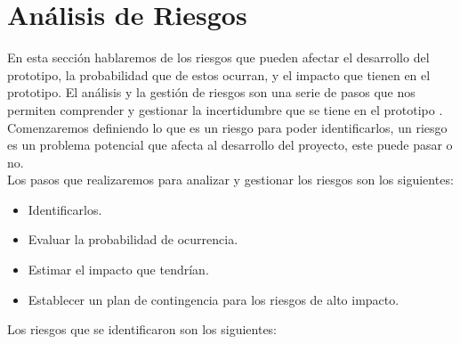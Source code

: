 \newpage\section{An{á}lisis de Riesgos}

En esta sección hablaremos de los riesgos que pueden afectar el desarrollo del prototipo, la probabilidad que de estos ocurran, y el impacto que tienen en el prototipo. El análisis y la gestión de riesgos son una serie de pasos que nos permiten comprender y gestionar la incertidumbre que se tiene en el prototipo \cite{cuarentaycuatro}. \\

Comenzaremos definiendo lo que es un riesgo para poder identificarlos, un riesgo es un problema potencial que afecta al desarrollo del proyecto, este puede pasar o no. \\

Los pasos que realizaremos para analizar y gestionar los riesgos son los siguientes: \\

\begin{itemize}
	\item Identificarlos.
	\item Evaluar la probabilidad de ocurrencia.
	\item Estimar el impacto que tendrían.
	\item Establecer un plan de contingencia para los riesgos de alto impacto.	
\end{itemize}

Los riesgos que se identificaron son los siguientes: \\

